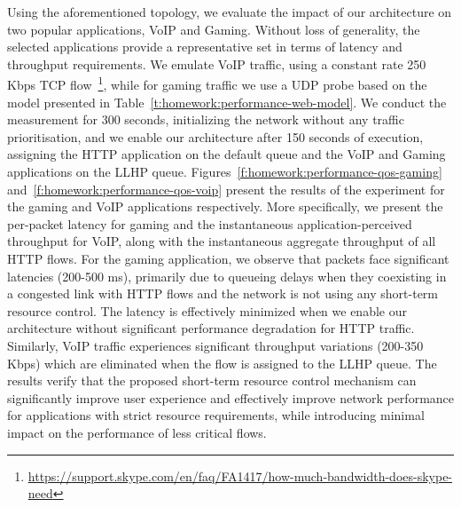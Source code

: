 Using the aforementioned topology, we evaluate the impact of our architecture
on two popular applications, VoIP and Gaming. Without loss of generality, the
selected applications provide a representative set in terms of  latency and
throughput requirements.  We emulate VoIP traffic, using a constant rate 250
Kbps TCP
flow~\footnote{\url{https://support.skype.com/en/faq/FA1417/how-much-bandwidth-does-skype-need}},
while for gaming traffic we use a UDP probe based on the model presented in
Table~\ref{t:homework:performance-web-model}. We conduct the measurement for
300 seconds, initializing the network without any traffic prioritisation, and
we enable our architecture after 150 seconds of execution, assigning the HTTP
application on the default queue and the VoIP and Gaming applications on the
LLHP queue. Figures~\ref{f:homework:performance-qos-gaming}
and~\ref{f:homework:performance-qos-voip} present the results of the experiment
for the gaming and VoIP applications respectively. More specifically, we
present the per-packet latency for gaming and the instantaneous
application-perceived throughput for VoIP, along with the instantaneous
aggregate throughput of all HTTP flows. For the gaming application, we observe
that packets face significant latencies (200-500 ms), primarily due to
queueing delays when they coexisting in a congested link with HTTP flows and
the network is not using any short-term resource control. The latency is
effectively minimized when we enable our architecture without significant
performance degradation for HTTP traffic. Similarly, VoIP traffic experiences
significant throughput variations (200-350 Kbps) which are eliminated when the
flow is assigned to the LLHP queue.  The results verify that the proposed
short-term resource control mechanism can significantly improve user
experience and effectively improve network performance for applications
with strict resource requirements, while introducing minimal impact on
the performance of less critical flows.

